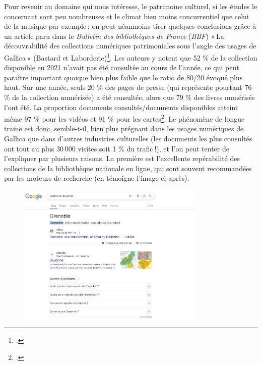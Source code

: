 Pour revenir au domaine qui nous intéresse, le patrimoine culturel, si les études le concernant sont peu nombreuses et le climat bien moins concurrentiel que celui de la musique par exemple ; on peut néanmoins tirer quelques conclusions grâce à un article paru dans le \textit{Bulletin des bibliothèques de France} (\textit{BBF}) « La découvrabilité des collections numériques patrimoniales sous l’angle des usages de Gallica » (Bastard et Laborderie)\footcite{bastard2023}. Les auteurs y notent que 52 \% de la collection disponible en 2021 n’avait pas été consultée au cours de l’année, ce qui peut paraître important quoique bien plus faible que le ratio de 80/20 évoqué plus haut. Sur une année, seuls 20 \% des pages de presse (qui représente pourtant 76 \% de la collection numérisée) a été consultée, alors que 79 \% des livres numérisés l'ont été. La proportion documents consultés/documents disponibles atteint même 97 \% pour les vidéos et 91 \% pour les cartes\footcite[§ 8]{bastard2023}. Le phénomène de longue traine est donc, semble-t-il, bien plus prégnant dans les usages numériques de Gallica que dans d’autres industries culturelles (les documents les plus consultés ont tout au plus 30 000 visites soit 1 \% du trafic !), et l’on peut tenter de l’expliquer par plusieurs raisons. La première est l’excellente repérabilité des collections de la bibliothèque nationale en ligne, qui sont souvent recommandées par les moteurs de recherche (en témoigne l’image ci-après).


\begin{figure}[h!]
	\centering
	\includegraphics[width=0.8\textwidth]{images/image25.png}
	\label{fig:image25}
\end{figure}



